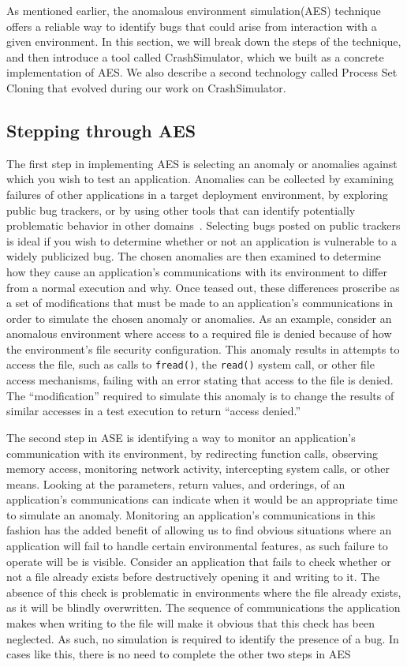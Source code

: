 As mentioned earlier,
the anomalous environment simulation(AES) technique
offers a reliable way to identify bugs
that could arise from interaction with a given environment.
In this section,
we will break down the steps of the technique,
and then introduce a tool called CrashSimulator,
which we built as a concrete implementation of AES.
We also describe a second technology
called Process Set Cloning
that evolved during our work on CrashSimulator.


\subsection{Stepping through AES}

The first step in implementing AES
is selecting an anomaly or anomalies
against which you wish to test an application.
Anomalies can be collected
by examining failures of other applications
in a target deployment environment,
by exploring public bug trackers,
or by using other tools that can identify
potentially problematic behavior in other domains~\cite{Zhuang_NSDI_2014,
rasley2015detecting}.
Selecting bugs posted on public trackers
is ideal if you wish to determine
whether or not an application
is vulnerable to a widely publicized bug.
The chosen anomalies are then examined
to determine how they cause an application's communications
with its environment
to differ from a normal execution and why.
Once teased out,
these differences proscribe
as a set of modifications
that must be made to an application's communications
in order to simulate the chosen anomaly or anomalies.
As an example,
consider an anomalous environment
where access to a required file is denied because of
how the environment's file security configuration.
This anomaly results in attempts to access the file,
such as calls to {\tt fread()},
the {\tt read()} system call,
or other file access mechanisms,
failing with an error stating that access to the file is denied.
The ``modification'' required to simulate this anomaly
is to change the results of similar accesses
in a test execution
to return ``access denied.''

The second step in ASE
is identifying
a way to monitor an application's communication
with its environment,
by redirecting function calls,
observing memory access,
monitoring network activity,
intercepting system calls,
or other means.
Looking at the parameters,
return values,
and orderings,
of an application's communications
can indicate
when it would be an appropriate time to simulate an anomaly.
Monitoring an application's communications
in this fashion
has the added benefit
of allowing us to find obvious situations
where an application will fail
to handle certain environmental features,
as such failure to operate will be
is visible.
Consider an application that fails to check whether or not
a file already exists
before destructively opening it and writing to it.
The absence of this check
is problematic in environments where the file already exists,
as it will be blindly overwritten.
The sequence of communications
the application makes when writing to the file
will make it obvious that this check has been neglected.
As such,
no simulation is required to identify the presence of a bug.
In cases like this,
there is no need to complete the other two steps in AES

